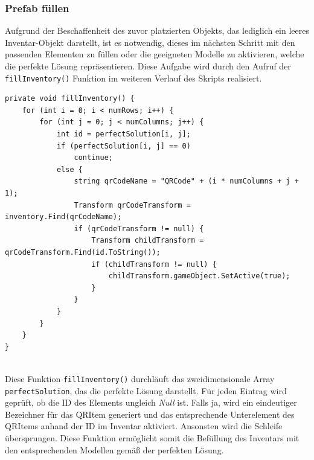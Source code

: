 \subsubsection{Prefab füllen}
Aufgrund der Beschaffenheit des zuvor platzierten Objekts, das lediglich ein leeres Inventar-Objekt darstellt, ist es
notwendig, dieses im nächsten Schritt mit den passenden Elementen zu füllen oder die geeigneten Modelle zu aktivieren,
welche die perfekte Lösung repräsentieren. Diese Aufgabe wird durch den Aufruf der \texttt{fillInventory()} Funktion im
weiteren Verlauf des Skripts realisiert.
\begin{lstlisting}[style=csharp, caption={Inventar fuellen}, label=code:invFül_PSV]
private void fillInventory() {
    for (int i = 0; i < numRows; i++) {
        for (int j = 0; j < numColumns; j++) {
            int id = perfectSolution[i, j];
            if (perfectSolution[i, j] == 0)
                continue;
            else {
                string qrCodeName = "QRCode" + (i * numColumns + j + 1);
                Transform qrCodeTransform = inventory.Find(qrCodeName);
                if (qrCodeTransform != null) {
                    Transform childTransform = qrCodeTransform.Find(id.ToString());
                    if (childTransform != null) {
                        childTransform.gameObject.SetActive(true);
                    }
                }
            }
        }
    }
}
\end{lstlisting}\\
Diese Funktion \texttt{fillInventory()} durchläuft das zweidimensionale Array \texttt{perfectSolution}, das die perfekte
Lösung darstellt. Für jeden Eintrag wird geprüft, ob die ID des Elements ungleich \textit{Null} ist. Falls ja, wird ein
eindeutiger Bezeichner für das QRItem generiert und das entsprechende Unterelement des QRItems anhand der ID im Inventar
aktiviert. Ansonsten wird die Schleife übersprungen. Diese Funktion ermöglicht somit die Befüllung des Inventars mit den
entsprechenden Modellen gemäß der perfekten Lösung.

